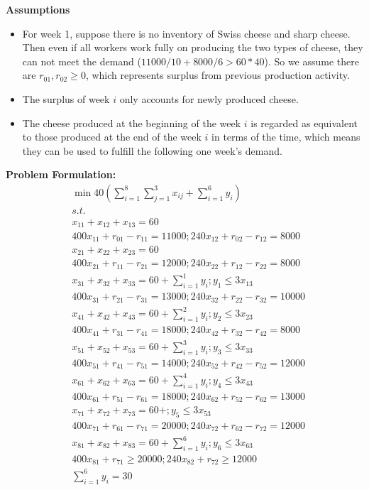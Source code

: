 \documentclass[11pt]{article}
\providecommand{\tightlist}{%
      \setlength{\itemsep}{0pt}\setlength{\parskip}{0pt}}
\begin{document}
\textbf{Assumptions}

\begin{itemize}
\tightlist
\item
  For week 1, suppose there is no inventory of Swiss cheese and sharp
  cheese. Then even if all workers work fully on producing the two types
  of cheese, they can not meet the demand
  (\(11000/10 + 8000/6 > 60 * 40\)). So we assume there are
  \(r_{01}, r_{02}\geq 0\), which represents surplus from previous
  production activity.
\item
  The surplus of week \(i\) only accounts for newly produced cheese.
\item
  The cheese produced at the beginning of the week \(i\) is regarded as
  equivalent to those produced at the end of the week \(i\) in terms of
  the time, which means they can be used to fulfill the following one
  week's demand.
\end{itemize}

\textbf{Problem Formulation:} \[
\begin{align*}
    & \min 40 ( \sum_{i=1}^8 \sum_{j=1}^3 x_{ij} + \sum_{i=1}^6 y_{i}) \\
    & s.t. \\
    & x_{11} + x_{12} + x_{13} = 60 \\
    & 400x_{11} + r_{01} - r_{11} = 11000 ; 240x_{12} + r_{02} - r_{12} = 8000 \\
    & x_{21} + x_{22} + x_{23} = 60\\
    & 400x_{21} + r_{11} - r_{21} = 12000 ; 240x_{22} + r_{12} - r_{22} = 8000 \\
    & x_{31} + x_{32} + x_{33} = 60 + \sum_{i=1}^1y_{i} ; y_{1} \leq 3x_{13} \\
    & 400x_{31} + r_{21} - r_{31} = 13000  ; 240x_{32} + r_{22} - r_{32}= 10000  \\
    & x_{41} + x_{42} + x_{43} = 60 + \sum_{i=1}^2y_{i} ;  y_{2} \leq 3x_{23}\\
    & 400x_{41} + r_{31}  - r_{41}= 18000 ; 240x_{42} + r_{32} - r_{42}= 8000  \\
    & x_{51} + x_{52} + x_{53} = 60 + \sum_{i=1}^3y_{i} ; y_{3} \leq 3x_{33}\\
    & 400x_{51} + r_{41} - r_{51}= 14000  ; 240x_{52} + r_{42} - r_{52}= 12000 \\
&  x_{61} + x_{62} + x_{63} = 60 + \sum_{i=1}^4y_{i} ; y_{4} \leq 3x_{43} \\
& 400x_{61} + r_{51} - r_{61}= 18000  ; 240x_{62} + r_{52}- r_{62} = 13000 \\
& x_{71} + x_{72} + x_{73} = 60 + ;  y_{5} \leq 3x_{53}\\
& 400x_{71} + r_{61}- r_{71} = 20000  ; 240x_{72} + r_{62}- r_{72}
 = 12000 \\
 &  x_{81} + x_{82} + x_{83} = 60 + \sum_{i=1}^6y_{i}; y_{6} \leq 3x_{63}\\
 & 400x_{81} + r_{71} \geq 20000  ; 240x_{82} + r_{72} \geq 12000  \\
 & \sum_{i=1}^6y_{i} = 30
 \end{align*}
\]
\end{document}
